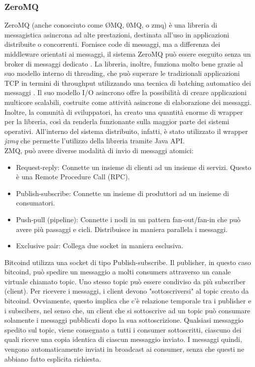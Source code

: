 \subsubsection{ZeroMQ}
\label{sec:ZMQ}
ZeroMQ (anche conosciuto come ØMQ, 0MQ, o zmq) è una libreria di messagistica asincrona ad alte prestazioni, destinata all'uso in applicazioni distribuite o concorrenti. Fornisce code di messaggi, ma a differenza dei middleware orientati ai messaggi, il sistema ZeroMQ può essere eseguito senza un broker di messaggi dedicato \cite{wiki:ZMQ}. La libreria, inoltre, funziona molto bene grazie al suo modello interno di threading, che può superare le tradizionali applicazioni TCP in termini di throughput utilizzando una tecnica di batching automatico dei messaggi \cite{ZMQ-throughput}. Il suo modello I/O asincrono offre la possibilità di creare applicazioni multicore scalabili, costruite come attività asincrone di elaborazione dei messaggi. Inoltre, la comunità di sviluppatori, ha creato una quantità enorme di wrapper per la libreria, così da renderla funzionante sulla maggior parte dei sistemi operativi. All'interno del sistema distribuito, infatti, è stato utilizzato il wrapper \textit{jzmq} che permette l'utilizzo della libreria tramite Java API. 
\\ZMQ, può avere diverse modalità di invio di messaggi atomici:
\begin{itemize}
\item Request-reply: Connette un insieme di clienti ad un insieme di servizi. Questo è una Remote Procedure Call (RPC).
\item Publish-subscribe: Connette un insieme di produttori ad un insieme di consumatori.
\item Push-pull (pipeline): Connette i nodi in un pattern fan-out/fan-in che può avere più passaggi e cicli. Distribuisce in maniera parallela i messaggi.
\item Exclusive pair: Collega due socket in maniera esclusiva.
\end{itemize}
Bitcoind utilizza una socket di tipo Publish-subscribe. Il publisher, in questo caso bitcoind, può spedire un messaggio a molti consumers attraverso un canale virtuale chiamato topic. Uno stesso topic può essere condiviso da più subscriber (client). Per ricevere i messaggi, i client devono "sottoscriversi" al topic creato da bitcoind. Ovviamente, questo implica che c'è relazione temporale tra i publisher e i subscibers, nel senso che, un client che si sottoscrive ad un topic può consumare solamente i messaggi pubblicati dopo la sua sottoscrizione.  Qualsiasi messaggio spedito sul topic, viene consegnato a tutti i consumer sottoscritti, ciascuno dei quali riceve una copia identica di ciascun messaggio inviato. I messaggi quindi, vengono automaticamente inviati in broadcast ai consumer, senza che questi ne abbiano fatto esplicita richiesta.
